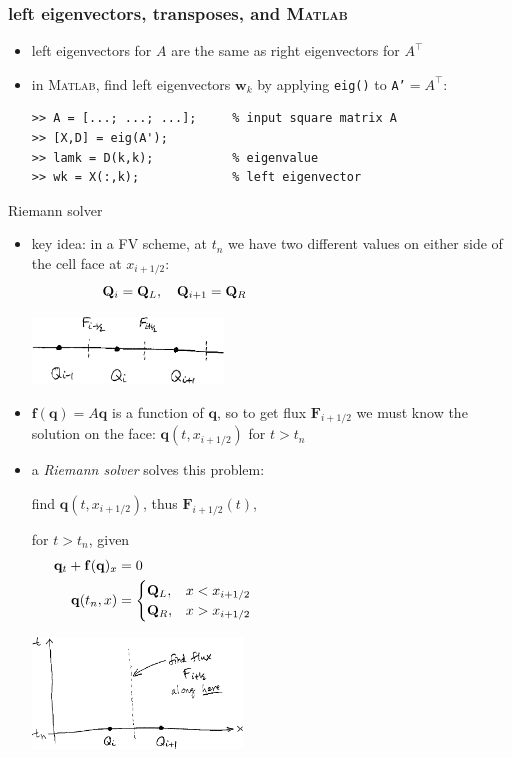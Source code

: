 \documentclass[10pt,dvipsnames,usepdftitle=false,
hyperref={pdftitle = {Finite volume methods},
    pdfauthor = {Ed Bueler}}]{beamer}
\newcommand{\bbf}{\mathbf{f}}
\newcommand{\bq}{\mathbf{q}}
\newcommand{\bw}{\mathbf{w}}
\newcommand{\bF}{\mathbf{F}}
\newcommand{\bQ}{\mathbf{Q}}
\newcommand{\Matlab}{\textsc{Matlab}\xspace}
\begin{document}
\begin{frame}[fragile]
\frametitle{left eigenvectors, transposes, and \Matlab}

\begin{itemize}
\item left eigenvectors for $A$ are the same as right eigenvectors for $A^\top$
\item in \Matlab, find left eigenvectors $\bw_k$ by applying \texttt{eig()} to \texttt{A'}$=A^\top$:
\begin{Verbatim}[fontsize=\small]
>> A = [...; ...; ...];     % input square matrix A
>> [X,D] = eig(A');
>> lamk = D(k,k);           % eigenvalue
>> wk = X(:,k);             % left eigenvector
\end{Verbatim}
\end{itemize}
\end{frame}


\begin{frame}{Riemann solver}

\begin{itemize}
\item key idea: in a FV scheme, at $t_n$ we have \alert{two different values on either side of the cell face} at $x_{i+1/2}$:
    $$\bQ_{i} = \bQ_L, \quad \bQ_{i+1} = \bQ_R \hspace{50mm}$$

\vspace{-12mm}
\hfill \includegraphics[width=0.4\textwidth]{figs/cellfluxsketch}

\medskip
\item $\bbf(\bq) = A\bq$ is a function of $\bq$, so to get flux $\bF_{i+1/2}$ we must know the solution on the face: $\bq(t,x_{i+1/2})$ for $t > t_n$
\item a \emph{Riemann solver} solves this problem:

\bigskip
find $\bq(t,x_{i+1/2})$, thus $\bF_{i+1/2}(t)$,

for $t > t_n$, given
\begin{align*}
\bq_t + \bbf(\bq)_x &= 0 \\
\bq(t_n,x) &= \begin{cases} \bQ_L, & x < x_{i+1/2} \\
                            \bQ_R, & x > x_{i+1/2} \end{cases} \hspace{60mm}
\end{align*}

\vspace{-30mm}
\hfill \includegraphics[width=0.44\textwidth]{figs/rsolversketch}
\end{itemize}
\end{frame}
\end{document}
